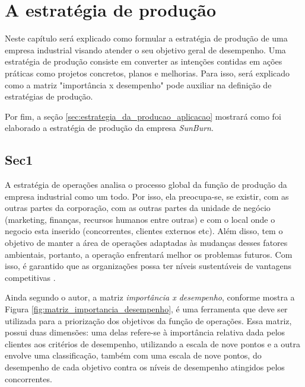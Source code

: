 \chapter{A estratégia de produção} 
\label{chap:estrategia_da_producao} 
Neste capítulo será explicado como formular a estratégia de produção de uma empresa industrial visando atender o seu objetivo geral de desempenho. Uma estratégia de produção consiste em converter as intenções contidas em ações práticas como projetos concretos, planos e melhorias. Para isso, será explicado como a matriz "importância x desempenho" pode auxiliar na definição de estratégias de produção.

Por fim, a seção \ref{sec:estrategia_da_producao_aplicacao} mostrará como foi elaborado a estratégia de produção da empresa \textit{SunBurn}. 

\section{Sec1} 
\label{sec:estrategia_da_producao_sec1} 
A estratégia de operações analisa o processo global da função de produção da empresa industrial como um todo. Por isso, ela preocupa-se, se existir, com as outras partes da corporação, com as outras partes da unidade de negócio (marketing, finanças, recursos humanos entre outras) e com o local onde o negocio esta inserido (concorrentes, clientes externos etc). Além disso, tem o objetivo de manter a área de operações adaptadas às mudanças desses fatores ambientais, portanto, a operação enfrentará melhor os problemas futuros. Com isso, é garantido que as organizações possa ter níveis sustentáveis de vantagens competitivas \cite{correa2000administracao}.

Ainda segundo o autor, a matriz \textit{importância x desempenho}, conforme mostra a Figura \ref{fig:matriz_importancia_desempenho},  é uma ferramenta que deve ser utilizada para a priorização dos objetivos da função de operações. Essa matriz, possui duas dimensões: uma delas refere-se à importância relativa dada pelos clientes aos critérios de desempenho, utilizando a escala de nove pontos e a outra envolve uma classificação, também com uma escala de nove pontos, do desempenho de cada objetivo contra os níveis de desempenho atingidos pelos concorrentes.

